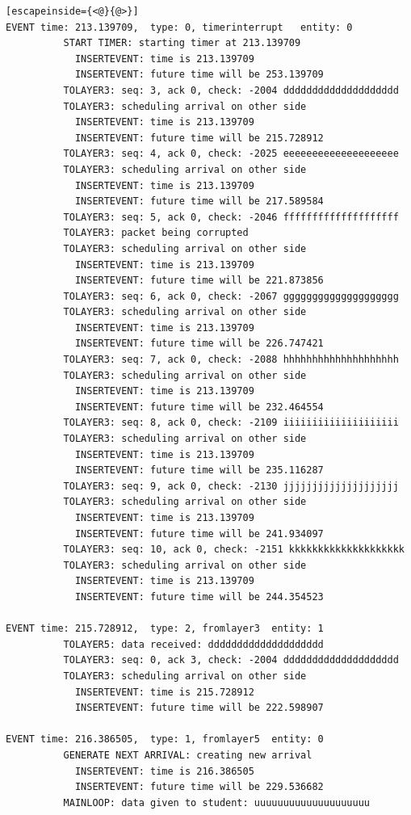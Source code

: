 \documentclass[paper=a4, fontsize=11pt]{scrartcl}
\numberwithin{equation}{section}		%
\numberwithin{figure}{section}			%
\numberwithin{table}{section}				%
\begin{document}
\begin{lstlisting}[escapeinside={<@}{@>}]
EVENT time: 213.139709,  type: 0, timerinterrupt   entity: 0
          START TIMER: starting timer at 213.139709
            INSERTEVENT: time is 213.139709
            INSERTEVENT: future time will be 253.139709
          TOLAYER3: seq: 3, ack 0, check: -2004 dddddddddddddddddddd
          TOLAYER3: scheduling arrival on other side
            INSERTEVENT: time is 213.139709
            INSERTEVENT: future time will be 215.728912
          TOLAYER3: seq: 4, ack 0, check: -2025 eeeeeeeeeeeeeeeeeeee
          TOLAYER3: scheduling arrival on other side
            INSERTEVENT: time is 213.139709
            INSERTEVENT: future time will be 217.589584
          TOLAYER3: seq: 5, ack 0, check: -2046 ffffffffffffffffffff
          TOLAYER3: packet being corrupted
          TOLAYER3: scheduling arrival on other side
            INSERTEVENT: time is 213.139709
            INSERTEVENT: future time will be 221.873856
          TOLAYER3: seq: 6, ack 0, check: -2067 gggggggggggggggggggg
          TOLAYER3: scheduling arrival on other side
            INSERTEVENT: time is 213.139709
            INSERTEVENT: future time will be 226.747421
          TOLAYER3: seq: 7, ack 0, check: -2088 hhhhhhhhhhhhhhhhhhhh
          TOLAYER3: scheduling arrival on other side
            INSERTEVENT: time is 213.139709
            INSERTEVENT: future time will be 232.464554
          TOLAYER3: seq: 8, ack 0, check: -2109 iiiiiiiiiiiiiiiiiiii
          TOLAYER3: scheduling arrival on other side
            INSERTEVENT: time is 213.139709
            INSERTEVENT: future time will be 235.116287
          TOLAYER3: seq: 9, ack 0, check: -2130 jjjjjjjjjjjjjjjjjjjj
          TOLAYER3: scheduling arrival on other side
            INSERTEVENT: time is 213.139709
            INSERTEVENT: future time will be 241.934097
          TOLAYER3: seq: 10, ack 0, check: -2151 kkkkkkkkkkkkkkkkkkkk
          TOLAYER3: scheduling arrival on other side
            INSERTEVENT: time is 213.139709
            INSERTEVENT: future time will be 244.354523

EVENT time: 215.728912,  type: 2, fromlayer3  entity: 1
          TOLAYER5: data received: dddddddddddddddddddd
          TOLAYER3: seq: 0, ack 3, check: -2004 dddddddddddddddddddd
          TOLAYER3: scheduling arrival on other side
            INSERTEVENT: time is 215.728912
            INSERTEVENT: future time will be 222.598907

EVENT time: 216.386505,  type: 1, fromlayer5  entity: 0
          GENERATE NEXT ARRIVAL: creating new arrival
            INSERTEVENT: time is 216.386505
            INSERTEVENT: future time will be 229.536682
          MAINLOOP: data given to student: uuuuuuuuuuuuuuuuuuuu


\end{lstlisting}
\end{document}
